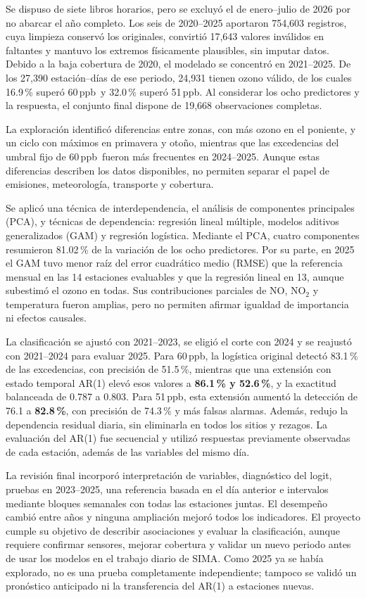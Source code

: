 \documentclass[11pt,letterpaper]{article}
\newcommand{\ppb}{\,ppb}
\newenvironment{cambio}{}{}
\begin{document}
Se dispuso de siete libros horarios, pero se excluyó el de enero--julio de 2026 por no abarcar el año completo. Los seis de 2020--2025 aportaron 754,603 registros, cuya limpieza conservó los originales, convirtió 17,643 valores inválidos en faltantes y mantuvo los extremos físicamente plausibles, sin imputar datos. Debido a la baja cobertura de 2020, el modelado se concentró en 2021--2025. De los 27,390 estación--días de ese periodo, 24,931 tienen ozono válido, de los cuales 16.9\,\% superó 60\ppb\ y 32.0\,\% superó 51\ppb. Al considerar los ocho predictores y la respuesta, el conjunto final dispone de 19,668 observaciones completas.

La exploración identificó diferencias entre zonas, con más ozono en el poniente, y un ciclo con máximos en primavera y otoño, mientras que las excedencias del umbral fijo de 60\ppb\ fueron más frecuentes en 2024--2025. Aunque estas diferencias describen los datos disponibles, no permiten separar el papel de emisiones, meteorología, transporte y cobertura.

Se aplicó una técnica de interdependencia, el análisis de componentes principales (PCA), y técnicas de dependencia: regresión lineal múltiple, modelos aditivos generalizados (GAM) y regresión logística. Mediante el PCA, cuatro componentes resumieron 81.02\,\% de la variación de los ocho predictores. Por su parte, en 2025 el GAM tuvo menor raíz del error cuadrático medio (RMSE) que la referencia mensual en las 14 estaciones evaluables y que la regresión lineal en 13, aunque subestimó el ozono en todas. Sus contribuciones parciales de NO, NO$_2$ y temperatura fueron amplias, pero no permiten afirmar igualdad de importancia ni efectos causales.

La clasificación se ajustó con 2021--2023, se eligió el corte con 2024 y se reajustó con 2021--2024 para evaluar 2025. Para 60\ppb, la logística original detectó 83.1\,\% de las excedencias, con precisión de 51.5\,\%, mientras que una extensión con estado temporal AR(1) elevó esos valores a \textbf{86.1\,\% y 52.6\,\%}, y la exactitud balanceada de 0.787 a 0.803. Para 51\ppb, esta extensión aumentó la detección de 76.1 a \textbf{82.8\,\%}, con precisión de 74.3\,\% y más falsas alarmas. Además, redujo la dependencia residual diaria, sin eliminarla en todos los sitios y rezagos. La evaluación del AR(1) fue secuencial y utilizó respuestas previamente observadas de cada estación, además de las variables del mismo día.


\begin{cambio}
La revisión final incorporó interpretación de variables, diagnóstico del logit, pruebas en 2023--2025, una referencia basada en el día anterior e intervalos mediante bloques semanales con todas las estaciones juntas. El desempeño cambió entre años y ninguna ampliación mejoró todos los indicadores. El proyecto cumple su objetivo de describir asociaciones y evaluar la clasificación, aunque requiere confirmar sensores, mejorar cobertura y validar un nuevo periodo antes de usar los modelos en el trabajo diario de SIMA. Como 2025 ya se había explorado, no es una prueba completamente independiente; tampoco se validó un pronóstico anticipado ni la transferencia del AR(1) a estaciones nuevas.
\end{cambio}
\end{document}
